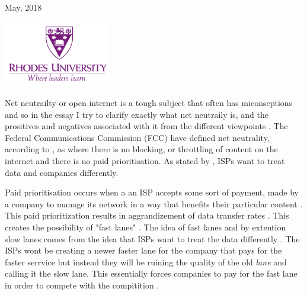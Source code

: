 \documentclass[11pt,a4paper]{newrucsthesis}
\renewcommand {\cite} {\citep}  %
\begin{document}
\begin{titlepage}
	\vfill\vfill\vfill %
	
	{\large May, 2018} %
	
	
	\vfill\vfill
	\includegraphics[width=0.35\textwidth]{Rhodes.png}\\[1cm] %
	
	
	
\end{titlepage}





\newpage	

Net neutrailty or open internet is a tough subject that often has miconseptions and so in the essay I try to clarify exactly what net neutraily is, and the prositives and negatives associated with it from the different viewpoints \cite{net}. The Federal Communications Commission (FCC) have defined net neutrality, according to \citet{jeremy2018}, as  where there is no blocking, or throttling of content on the internet and there is no paid prioritisation. As stated by \cite{jeremy2018}, ISPs want to treat data and companies differently.

Paid prioritisation occurs when a an ISP accepts some sort of payment, made by a company to manage its network in a way that benefits their particular content \cite{paidprio}. This paid prioritization results in aggrandizement of data transfer rates \cite{paidp}. This creates the possibility of "fast lanes" \cite{paidp}. The idea of fast lanes and by extention slow lanes comes from the idea that ISPs want to treat the data differently \cite{fast}. The ISPs wont be creating a newer faster lane for the company that pays for the faster serrvice but instead they will be ruining the quality of the old \textit{lane} and calling it the slow lane. This essentially forces companies to pay for the fast lane in order to compete with the compitition \cite{fast}. 
\end{document}
